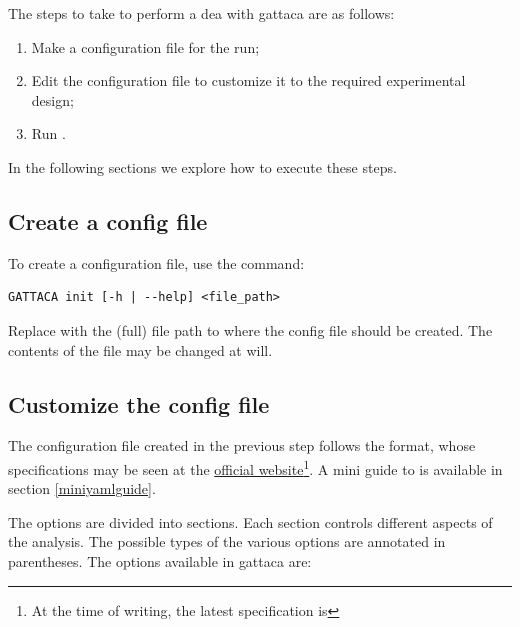 The steps to take to perform a \gls{dea} with \gls{gattaca} are as follows:
\begin{enumerate}
    \item Make a configuration file for the run;
    \item Edit the configuration file to customize it to the required experimental design;
    \item Run .
\end{enumerate}

In the following sections we explore how to execute these steps.

\subsection{Create a config file}
To create a configuration file, use the  command:
\begin{lstlisting}[style=ShellStyle]
GATTACA init [-h | --help] <file_path>
\end{lstlisting}
Replace  with the (full) file path to where the config file should be created. The contents of the file may be changed at will.

\subsection{Customize the config file}
The configuration file created in the previous step follows the  format, whose specifications may be seen at the \href{https://yaml.org/}{official  website}\footnote{At the time of writing, the latest specification is }. A mini guide to  is available in section \ref{miniyamlguide}.

The options are divided into sections. Each section controls different aspects of the analysis. The possible types of the various options are annotated in parentheses. The options available in \gls{gattaca} are:

